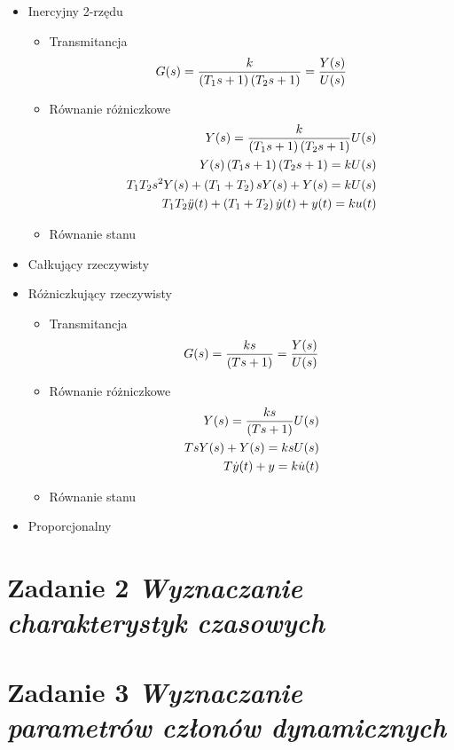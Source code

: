 \documentclass[a4paper,10pt]{article}
\begin{document}
\begin{itemize}
\item Inercyjny 2-rzędu
\begin{itemize}
\item Transmitancja
	\begin{eqnarray}
		G(s)= {k \over \left({T_{1}s + 1}\right) \left({T_{2}s + 1}\right)} = {Y(s) \over U(s)}
	\end{eqnarray}
\item Równanie różniczkowe
	\begin{eqnarray}
		Y(s) = {k \over {\left({T_{1}s + 1}\right) \left({T_{2}s + 1}\right)}} U(s)\\
		\nonumber Y(s)\left({T_{1}s + 1}\right) \left({T_{2}s + 1}\right)= kU(s)\\
		\nonumber T_{1}T_{2}s^{2}Y(s) + \left({T_{1} + T_{2}}\right) s Y(s) + Y(s)= kU(s)\\
		\nonumber T_{1}T_{2}\ddot{y}(t) + \left({T_{1} + T_{2}}\right) \dot{y}(t) + y(t)= k u(t)
	\end{eqnarray}
\item Równanie stanu
\end{itemize}

\item Całkujący rzeczywisty

\item Różniczkujący rzeczywisty
\begin{itemize}
\item Transmitancja
	\begin{eqnarray}
		G(s)= {ks \over \left({Ts + 1}\right)} = {Y(s) \over U(s)}
	\end{eqnarray}
\item Równanie różniczkowe
	\begin{eqnarray}
		Y(s) = {ks \over \left({Ts + 1}\right)}  U(s)\\
		\nonumber TsY(s)+Y(s)=k s U(s)\\
		\nonumber T\dot{y}(t)+y=k\dot{u}(t)
	\end{eqnarray}
\item Równanie stanu
\end{itemize}

\item Proporcjonalny

\end{itemize}

\section{Zadanie 2 \textit{\small Wyznaczanie charakterystyk czasowych}}\label{sec:zad2}
\section{Zadanie 3 \textit{\small Wyznaczanie parametrów członów dynamicznych}}\label{sec:zad3}
\end{document}
